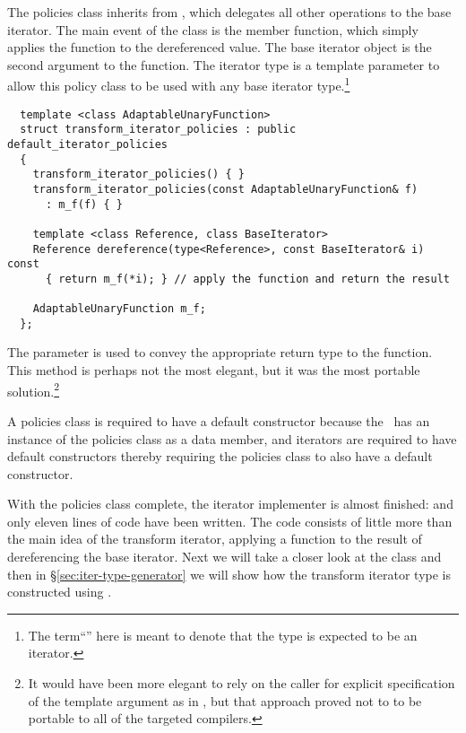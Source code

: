 \documentclass{netobjectdays}
\newcommand{\iteratoradaptor}{\code{iterator\_\-adaptor}}
\begin{document}
The policies class inherits from
, which delegates all other
operations to the base iterator. The main event of the
 class is the
 member function, which simply applies the
function to the dereferenced value. The base iterator object is the
second argument to the  function. The iterator
type is a template parameter to allow this policy class to be used
with any base iterator type.\footnote{The term``''
here is meant to denote that the  type is expected to be an
iterator.}

{\footnotesize
\begin{verbatim}
  template <class AdaptableUnaryFunction>
  struct transform_iterator_policies : public default_iterator_policies
  {
    transform_iterator_policies() { }
    transform_iterator_policies(const AdaptableUnaryFunction& f)
      : m_f(f) { }

    template <class Reference, class BaseIterator>
    Reference dereference(type<Reference>, const BaseIterator& i) const
      { return m_f(*i); } // apply the function and return the result

    AdaptableUnaryFunction m_f;
  };
\end{verbatim}
}

The  parameter is used to convey the appropriate return
type to the  function. This method is perhaps not the most
elegant, but it was the most portable solution.\footnote{It would have been more
elegant to rely on the caller for explicit specification of the 
template argument as in
, but that approach
proved not to to be portable to all of the targeted compilers.}

A policies class is required to have a default constructor because the
\iteratoradaptor\ has an instance of the policies class as a
data member, and iterators are required to have default constructors
thereby requiring the policies class to also have a default
constructor.

With the policies class complete, the iterator implementer is almost
finished: and only eleven lines of code have been written. The code
consists of little more than the main idea of the transform iterator,
applying a function to the result of dereferencing the base iterator.
Next we will take a closer look at the
 class and then in
\S\ref{sec:iter-type-generator} we will show how the transform
iterator type is constructed using \iteratoradaptor{}.
\end{document}
